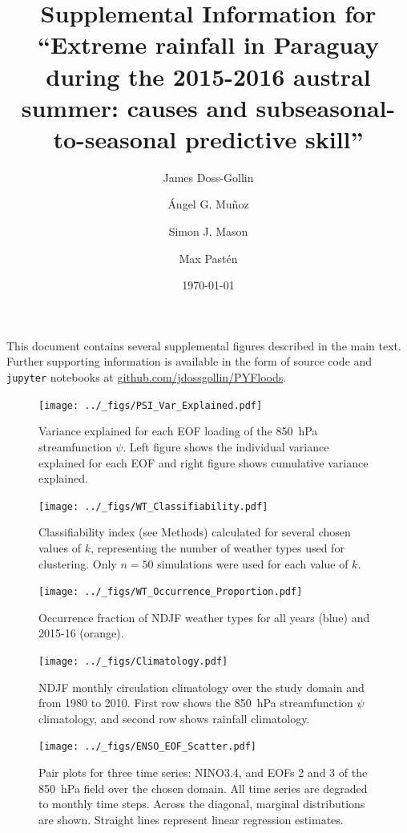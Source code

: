 \documentclass{article}
\title{Supplemental Information for\\``Extreme rainfall in Paraguay during the 2015-2016 austral summer: causes and subseasonal-to-seasonal predictive skill''}
\author{James Doss-Gollin\and \'{A}ngel G. Mu\~{n}oz \and Simon J. Mason \and Max Past\'{e}n}
\date{\today}
\begin{document}
\maketitle

This document contains several supplemental figures described in the main text.
Further supporting information is available in the form of source code and \texttt{jupyter} notebooks at \url{github.com/jdossgollin/PYFloods}.
\listoffigures
\clearpage

\begin{figure}
  \texttt{[image: ../\_figs/PSI\_Var\_Explained.pdf]}
	\caption{
		Variance explained for each EOF loading of the \SI{850}{\hecto\pascal} streamfunction $\psi$.
    Left figure shows the individual variance explained for each EOF and right figure shows cumulative variance explained.
	}
\end{figure}

\begin{figure}
  \texttt{[image: ../\_figs/WT\_Classifiability.pdf]}
	\caption{
		Classifiability index (see Methods) calculated for several chosen values of $k$, representing the number of weather types used for clustering.
		Only $n=50$ simulations were used for each value of $k$.
	}
\end{figure}

\begin{figure}
  \texttt{[image: ../\_figs/WT\_Occurrence\_Proportion.pdf]}
	\caption{
		Occurrence fraction of NDJF weather types for all years (blue) and 2015-16 (orange).
	}
\end{figure}

\begin{figure}
	\texttt{[image: ../\_figs/Climatology.pdf]}
	\caption{
		NDJF monthly circulation climatology over the study domain and from 1980 to 2010.
    First row shows the \SI{850}{\hecto\pascal} streamfunction $\psi$ climatology, and second row shows rainfall climatology.
	}
\end{figure}

\begin{figure}
  \texttt{[image: ../\_figs/ENSO\_EOF\_Scatter.pdf]}
	\caption{
		Pair plots for three time series: NINO3.4, and EOFs 2 and 3 of the \SI{850}{\hecto\pascal} field over the chosen domain.
    All time series are degraded to monthly time steps.
    Across the diagonal, marginal distributions are shown.
    Straight lines represent linear regression estimates.
	}
\end{figure}
\end{document}
